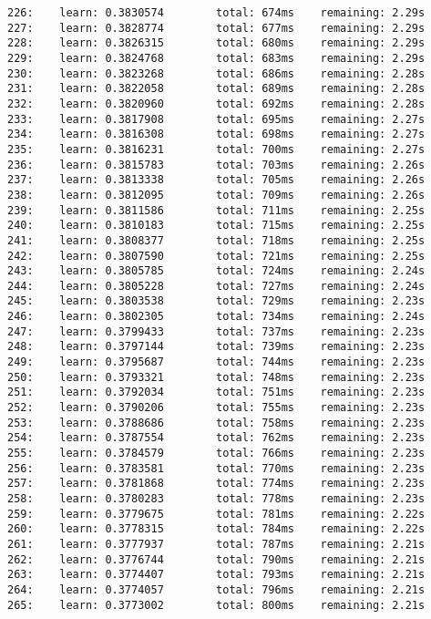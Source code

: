 \documentclass[11pt]{article}
\begin{document}
\begin{Verbatim}[commandchars=\\\{\}]
226:    learn: 0.3830574        total: 674ms    remaining: 2.29s
227:    learn: 0.3828774        total: 677ms    remaining: 2.29s
228:    learn: 0.3826315        total: 680ms    remaining: 2.29s
229:    learn: 0.3824768        total: 683ms    remaining: 2.29s
230:    learn: 0.3823268        total: 686ms    remaining: 2.28s
231:    learn: 0.3822058        total: 689ms    remaining: 2.28s
232:    learn: 0.3820960        total: 692ms    remaining: 2.28s
233:    learn: 0.3817908        total: 695ms    remaining: 2.27s
234:    learn: 0.3816308        total: 698ms    remaining: 2.27s
235:    learn: 0.3816231        total: 700ms    remaining: 2.27s
236:    learn: 0.3815783        total: 703ms    remaining: 2.26s
237:    learn: 0.3813338        total: 705ms    remaining: 2.26s
238:    learn: 0.3812095        total: 709ms    remaining: 2.26s
239:    learn: 0.3811586        total: 711ms    remaining: 2.25s
240:    learn: 0.3810183        total: 715ms    remaining: 2.25s
241:    learn: 0.3808377        total: 718ms    remaining: 2.25s
242:    learn: 0.3807590        total: 721ms    remaining: 2.25s
243:    learn: 0.3805785        total: 724ms    remaining: 2.24s
244:    learn: 0.3805228        total: 727ms    remaining: 2.24s
245:    learn: 0.3803538        total: 729ms    remaining: 2.23s
246:    learn: 0.3802305        total: 734ms    remaining: 2.24s
247:    learn: 0.3799433        total: 737ms    remaining: 2.23s
248:    learn: 0.3797144        total: 739ms    remaining: 2.23s
249:    learn: 0.3795687        total: 744ms    remaining: 2.23s
250:    learn: 0.3793321        total: 748ms    remaining: 2.23s
251:    learn: 0.3792034        total: 751ms    remaining: 2.23s
252:    learn: 0.3790206        total: 755ms    remaining: 2.23s
253:    learn: 0.3788686        total: 758ms    remaining: 2.23s
254:    learn: 0.3787554        total: 762ms    remaining: 2.23s
255:    learn: 0.3784579        total: 766ms    remaining: 2.23s
256:    learn: 0.3783581        total: 770ms    remaining: 2.23s
257:    learn: 0.3781868        total: 774ms    remaining: 2.23s
258:    learn: 0.3780283        total: 778ms    remaining: 2.23s
259:    learn: 0.3779675        total: 781ms    remaining: 2.22s
260:    learn: 0.3778315        total: 784ms    remaining: 2.22s
261:    learn: 0.3777937        total: 787ms    remaining: 2.21s
262:    learn: 0.3776744        total: 790ms    remaining: 2.21s
263:    learn: 0.3774407        total: 793ms    remaining: 2.21s
264:    learn: 0.3774057        total: 796ms    remaining: 2.21s
265:    learn: 0.3773002        total: 800ms    remaining: 2.21s

\end{Verbatim}
\end{document}
